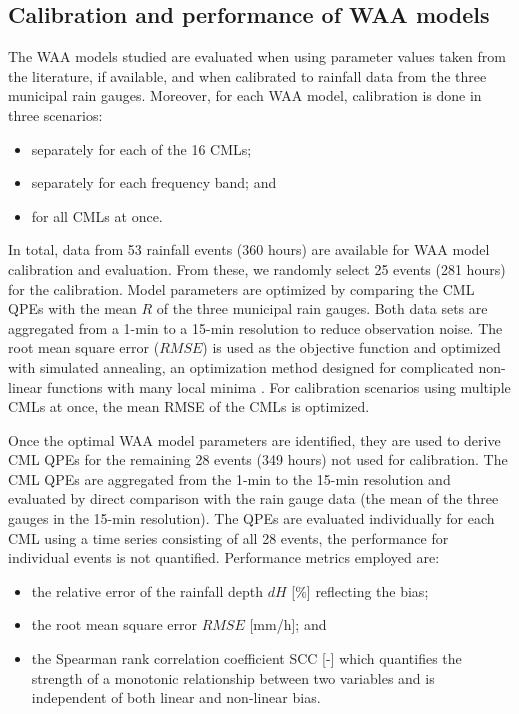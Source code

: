 \documentclass{ctuthesis}\usepackage[]{graphicx}\usepackage[]{color}
\begin{document}
\subsection{Calibration and performance of WAA models} \label{paperIIMethC}

The WAA models studied are evaluated when using parameter values taken from the literature, if available, and when calibrated to rainfall data from the three municipal rain gauges. Moreover, for each WAA model, calibration is done in three scenarios:
        \begin{itemize}
        \itemsep0em 
                \item{separately for each of the 16 CMLs;}
                \item{separately for each frequency band; and}
                \item{for all CMLs at once.}
        \end{itemize}
        

In total, data from 53 rainfall events (360 hours) are available for WAA model  calibration and evaluation. From these, we randomly select 25 events (281 hours) for the calibration. Model parameters are optimized by comparing the CML QPEs with the mean $R$ of the three municipal rain gauges. Both data sets are aggregated from a 1-min to a 15-min resolution to reduce observation noise. The root mean square error ($RMSE$) is used as the objective function and optimized with simulated annealing, an optimization method designed for complicated non-linear functions with many local minima \citep{xiangGeneralizedSimulatedAnnealing2013}. For calibration scenarios using multiple CMLs at once, the mean RMSE of the CMLs is optimized.

Once the optimal WAA model parameters are identified, they are used to derive CML QPEs for the remaining 28 events (349 hours) not used for calibration. The CML QPEs are aggregated from the 1-min to the 15-min resolution and evaluated by direct comparison with the rain gauge data (the mean of the three gauges in the 15-min resolution). The QPEs are evaluated individually for each CML using a time series consisting of all 28 events, the performance for individual events is not quantified. Performance metrics employed are: 
        \begin{samepage}
        \begin{itemize}
        \itemsep0em 
                \item{the relative error of the rainfall depth $dH$ [\%] reflecting the bias;}
                \item{the root mean square error $RMSE$ [mm/h]}; and
                \item{the Spearman rank correlation coefficient SCC [-] which quantifies the strength of a monotonic relationship between two variables and is independent of both linear and non-linear bias.}
        \end{itemize}
        \end{samepage}
\end{document}
